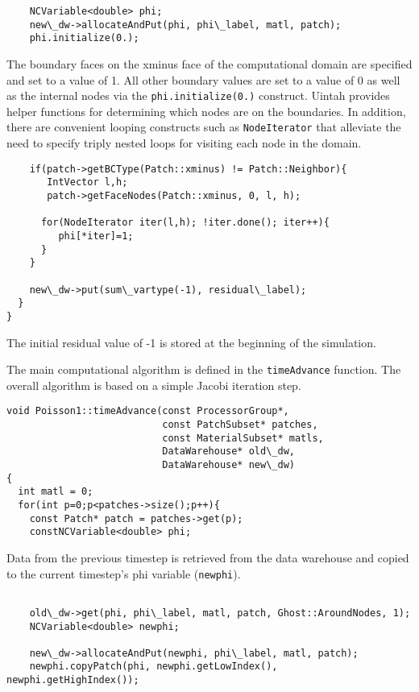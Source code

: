 \documentclass[12pt]{report}
\begin{document}
\begin{verbatim}
    NCVariable<double> phi;
    new\_dw->allocateAndPut(phi, phi\_label, matl, patch);
    phi.initialize(0.);
\end{verbatim}

The boundary faces on the xminus face of the computational domain are
specified and set to a value of 1.  All other boundary values are set
to a value of 0 as well as the internal nodes via the
\texttt{phi.initialize(0.)} construct.  Uintah provides helper
functions for determining which nodes are on the boundaries.  In
addition, there are convenient looping constructs such as
\texttt{NodeIterator} that alleviate the need to specify triply nested
loops for visiting each node in the domain.

\begin{verbatim}
    if(patch->getBCType(Patch::xminus) != Patch::Neighbor){
       IntVector l,h;
       patch->getFaceNodes(Patch::xminus, 0, l, h);

      for(NodeIterator iter(l,h); !iter.done(); iter++){
         phi[*iter]=1;
      }
    }

    new\_dw->put(sum\_vartype(-1), residual\_label);
  }
}

\end{verbatim}

The initial residual value of -1 is stored at the beginning of the
simulation.

The main computational algorithm is defined in the
\texttt{timeAdvance} function.  The overall algorithm is based on a
simple Jacobi iteration step.

\begin{verbatim}
void Poisson1::timeAdvance(const ProcessorGroup*,
                           const PatchSubset* patches,
                           const MaterialSubset* matls,
                           DataWarehouse* old\_dw,
                           DataWarehouse* new\_dw)
{
  int matl = 0;
  for(int p=0;p<patches->size();p++){
    const Patch* patch = patches->get(p);
    constNCVariable<double> phi;

\end{verbatim}

Data from the previous timestep is retrieved from the data warehouse
and copied to the current timestep's phi variable (\texttt{newphi}).

\begin{verbatim}

    old\_dw->get(phi, phi\_label, matl, patch, Ghost::AroundNodes, 1);
    NCVariable<double> newphi;

    new\_dw->allocateAndPut(newphi, phi\_label, matl, patch);
    newphi.copyPatch(phi, newphi.getLowIndex(), newphi.getHighIndex());

\end{verbatim}
\end{document}
